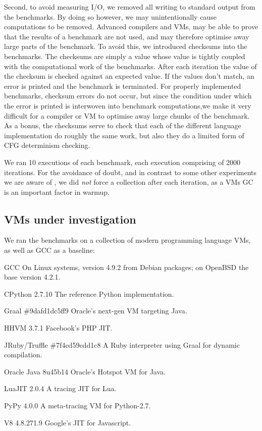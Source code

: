 \documentclass[10pt,preprint]{sigplanconf}
\begin{document}
Second, to avoid measuring I/O, we removed all writing to standard output from
the benchmarks. By doing so however, we may unintentionally cause computations
to be removed. Advanced compilers and VMs, may be able to prove that the
results of a benchmark are not used, and may therefore optimise away large
parts of the benchmark. To avoid this, we introduced checksums into the
benchmarks. The checksums are simply a value whose value is tightly coupled
with the computational work of the benchmarks. After each iteration the value
of the checksum is checked against an expected value. If the values don't
match, an error is printed and the benchmark is terminated. For properly
implemented benchmarks, checksum errors do not occur, but since the condition
under which the error is printed is interwoven into benchmark computations,we
make it very difficult for a compiler or VM to optimise away large chunks of
the benchmark. As a bonus, the checksums serve to check that each of the
different language implementation do roughly the same work, but also they do a
limited form of CFG determinism checking.

We ran 10 executions of each benchmark, each execution comprising of 2000
iterations. For the avoidance of doubt, and in
contrast to some other experiments we are aware of , we did
\emph{not} force a collection after each iteration, as a VMs GC is an important
factor in warmup.


\subsection{VMs under investigation}

We ran the benchmarks on a collection of modern programming language VMs,
as well as GCC as a baseline:
\begin{description*}
\item[GCC] On Linux systems, version 4.9.2 from Debian packages; on OpenBSD the base version 4.2.1.
\item[CPython 2.7.10] The reference Python implementation.
\item[Graal \#9dafd1dc5ff9] Oracle's next-gen VM targeting Java.
\item[HHVM 3.7.1] Facebook's PHP JIT.
\item[JRuby/Truffle \#7f4cd59cdd1c8] A Ruby interpreter using Graal for dynamic compilation.
\item[Oracle Java 8u45b14] Oracle's Hotspot VM for Java.
\item[LuaJIT 2.0.4] A tracing JIT for Lua.
\item[PyPy 4.0.0] A meta-tracing VM for Python-2.7.
\item[V8 4.8.271.9] Google's JIT for Javascript.
\end{description*}
\end{document}
